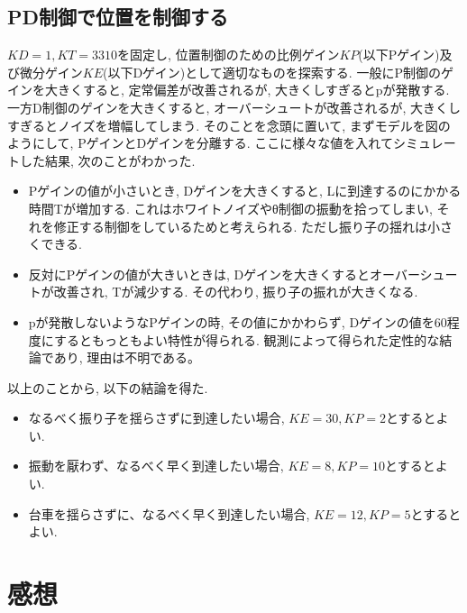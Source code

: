 \documentclass[12pt]{jsarticle}   	%
\begin{document}
\subsection{PD制御で位置を制御する}
\noindent
$KD=1,KT=3310$を固定し, 位置制御のための比例ゲイン$KP$(以下Pゲイン)及び微分ゲイン$KE$(以下Dゲイン)として適切なものを探索する.
一般にP制御のゲインを大きくすると, 定常偏差が改善されるが, 大きくしすぎるとpが発散する. 一方D制御のゲインを大きくすると, オーバーシュートが改善されるが, 大きくしすぎるとノイズを増幅してしまう.
\noindent
\newline
そのことを念頭に置いて, まずモデルを図のようにして, PゲインとDゲインを分離する. 
ここに様々な値を入れてシミュレートした結果, 次のことがわかった. 
\begin{itemize}
\item
Pゲインの値が小さいとき, Dゲインを大きくすると, Lに到達するのにかかる時間Tが増加する. これはホワイトノイズやθ制御の振動を拾ってしまい, それを修正する制御をしているためと考えられる. ただし振り子の揺れは小さくできる. 
\item
反対にPゲインの値が大きいときは, Dゲインを大きくするとオーバーシュートが改善され, Tが減少する. その代わり, 振り子の振れが大きくなる. 
\item
pが発散しないようなPゲインの時, その値にかかわらず, Dゲインの値を60程度にするともっともよい特性が得られる. 観測によって得られた定性的な結論であり, 理由は不明である。
\end{itemize}
以上のことから, 以下の結論を得た.
\begin{itemize}
\item
なるべく振り子を揺らさずに到達したい場合, $KE=30,KP=2$とするとよい.
\item
振動を厭わず、なるべく早く到達したい場合, $KE=8,KP=10$とするとよい.
\item
台車を揺らさずに、なるべく早く到達したい場合, $KE=12,KP=5$とするとよい.
\end{itemize}

\section{感想}
\subsection{}
\end{document}
